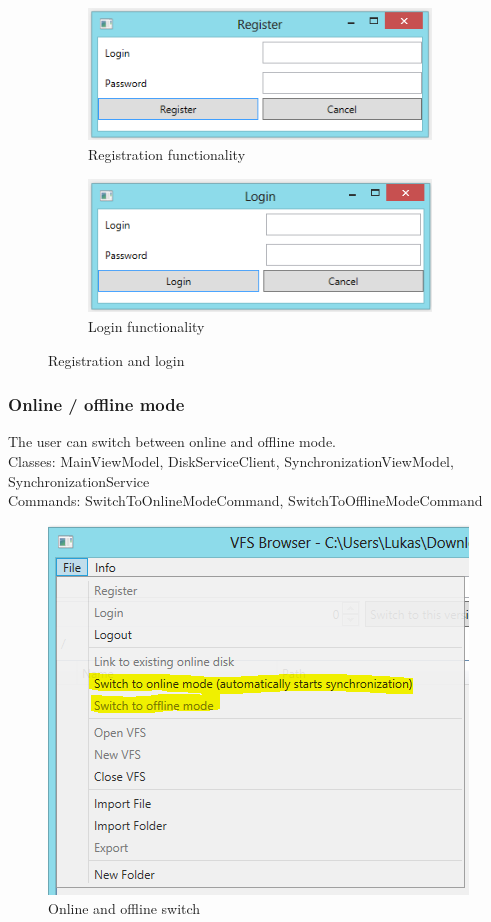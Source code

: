 \documentclass[JCDReport.tex]{subfiles}
\begin{document}
\begin{figure}[h!]
	\centering
	\begin{subfigure}[b]{1\textwidth}
		\centering
		\includegraphics[scale=1]{Images/registration.png}
		\caption{Registration functionality}
	\end{subfigure}
	
	\begin{subfigure}[b]{1\textwidth}
		\centering
		\includegraphics[scale=1]{Images/login.png} 
		\caption{Login functionality}
	\end{subfigure}
	\caption{Registration and login}
\end{figure}

\subsubsection{Online / offline mode}
The user can switch between online and offline mode.\\
Classes: MainViewModel, DiskServiceClient, SynchronizationViewModel, SynchronizationService\\
Commands: SwitchToOnlineModeCommand, SwitchToOfflineModeCommand
\begin{figure}[h!]
	\centering
	\includegraphics[scale=1]{Images/onlineofflinemode.png} 
	\caption{Online and offline switch}
\end{figure}	
\end{document}
